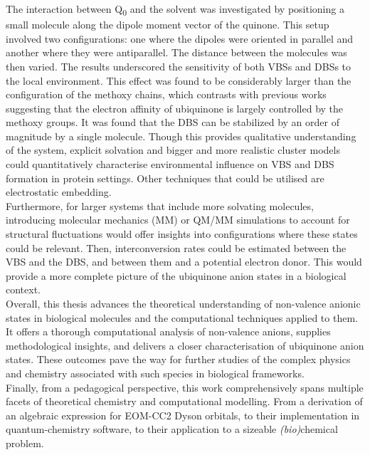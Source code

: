 The interaction between Q\textsubscript{0} and the solvent was investigated by positioning a small molecule along the dipole moment vector of the quinone. This setup involved two configurations: one where the dipoles were oriented in parallel and another where they were antiparallel. The distance between the molecules was then varied. The results underscored the sensitivity of both VBSs and DBSs to the local environment. This effect was found to be considerably larger than the configuration of the methoxy chains, which contrasts with previous works suggesting that the electron affinity of ubiquinone is largely controlled by the methoxy groups\cite{schulz2018systematic,taguchi2013tuning,taguchi2013conformational,deAlmeida2014effect}. It was found that the DBS can be stabilized by an order of magnitude by a single molecule.
Though this provides qualitative understanding of the system, explicit solvation and bigger and more realistic cluster models could quantitatively characterise environmental influence on VBS and DBS formation in protein settings. Other techniques that could be utilised are electrostatic embedding.\\

Furthermore, for larger systems that include more solvating molecules, introducing molecular mechanics (MM) or QM/MM simulations to account for structural fluctuations would offer insights into configurations where these states could be relevant. Then, interconversion rates could be estimated between the VBS and the DBS, and between them and a potential electron donor. This would provide a more complete picture of the ubiquinone anion states in a biological context.\\

Overall, this thesis advances the theoretical understanding of non-valence anionic states in biological molecules and the computational techniques applied to them. It offers a thorough computational analysis of non-valence anions, supplies methodological insights, and delivers a closer characterisation of ubiquinone anion states. These outcomes pave the way for further studies of the complex physics and chemistry associated with such species in biological frameworks.\\
Finally, from a pedagogical perspective, this work comprehensively spans multiple facets of theoretical chemistry and computational modelling. From a derivation of an algebraic expression for EOM-CC2 Dyson orbitals, to their implementation in quantum-chemistry software, to their application to a sizeable \textit{(bio)}chemical problem.\\

\cleardoublepage

